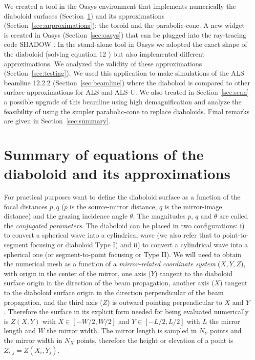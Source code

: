 \documentclass{iucr}              %
\newcommand{\inred}[1]{{\color{red}#1}}
\begin{document}

We created a tool in the Oasys environment \cite{codeOASYS} that implements numerically the diaboloid surfaces (Section~\ref{sec:DiaboloidEqs}) and its approximations (Section~\ref{sec:approximations}): the toroid and the parabolic-cone. A new widget is created in Oasys (Section~\ref{sec:oasys}) that can be plugged into the ray-tracing code SHADOW \cite{codeSHADOW}. 
In the stand-alone tool in Oasys \inred{we adopted the exact shape of the diaboloid (solving equation 12 \cite{part2}) but also implemented different approximations.} We analyzed the validity of \inred{these approximations} (Section~\ref{sec:testing}).
We used this application to make simulations of the ALS beamline 12.2.2 (Section~\ref{sec:beamline}) where the diaboloid is compared to other surface approximations for ALS and ALS-U. We also treated in Section~\ref{sec:scan} a possible upgrade of this beamline using high demagnification and analyze the feasibility of using the simpler parabolic-cone to replace diaboloids. Final remarks are given in Section~\ref{sec:summary}.

\inred{
\section{Summary of equations of the diaboloid and its approximations}
\label{sec:DiaboloidEqs}
}

For practical purposes want to define the diaboloid surface as a function of the focal distances $p,q$ ($p$ is the source-mirror distance, $q$ is the mirror-image distance) and the grazing incidence angle $\theta$. \inred{The magnitudes $p$, $q$ and $\theta$ are called the {\it conjugated parameters}.} The diaboloid can be placed in two configurations: i) to convert a spherical wave into a cylindrical wave (we also refer that to point-to-segment focusing or diaboloid Type I) and ii) to convert a cylindrical wave into a spherical one (or segment-to-point focusing or Type II). We will need to obtain the numerical mesh as a function of a {\it mirror-related coordinate system} ($X,Y,Z$), with origin in the center of the mirror, one axis ($Y$) tangent to the diaboloid surface origin in the direction of the beam propagation, another axis ($X$) tangent to the diaboloid surface origin in the direction perpendicular of the beam propagation, and the third axis ($Z$) is outward pointing perpendicular to $X$ and $Y$. Therefore the surface in its explicit form needed for being evaluated numerically is $Z(X,Y)$ with $X \in [-W/2, W/2]$ and $Y \in [-L/2, L/2]$ with $L$ the mirror length and $W$ the mirror width. The mirror length is sampled in $N_Y$ points and the mirror width in $N_X$ points, therefore the height or elevation of a point is $Z_{i,j}=Z(X_i,Y_j)$.
\end{document}

